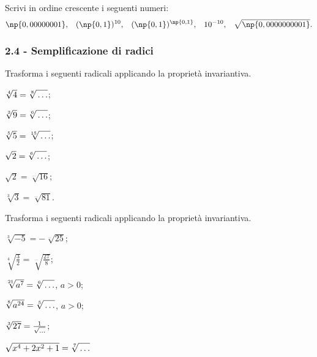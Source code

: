 \begin{esercizio}
 \label{ese:2.22}
Scrivi in ordine crescente i seguenti numeri:
 \[\np{0,00000001}\text{,}\quad (\np{0,1})^{10}\text{,}\quad (\np{0,1})^{\np{0,1}}\text{,}\quad 10^{-10}\text{,}\quad \sqrt{\np{0,0000000001}}.\]
\end{esercizio}

\subsubsection*{2.4 - Semplificazione di radici}
\begin{esercizio}
 \label{ese:2.23}
Trasforma i seguenti radicali applicando la proprietà invariantiva.
 \begin{multicols}{3}
 \begin{enumeratea}
 \item $\sqrt[4]4=\sqrt[8]{\vphantom{4}\ldots}$;
 \item $\sqrt[3]9=\sqrt[6]{\vphantom{4}\ldots}$;
 \item $\sqrt[5]5=\sqrt[15]{\vphantom{4}\ldots}$;
 \item $\sqrt 2=\sqrt[6]{\vphantom{4}\ldots}$;
 \item $\sqrt 2=\sqrt[\ldots]{16}$;
 \item $\sqrt[3]3=\sqrt[\ldots]{81}$.
 \end{enumeratea}
 \end{multicols}
\end{esercizio}

\begin{esercizio}
\label{ese:2.24}
Trasforma i seguenti radicali applicando la proprietà invariantiva.
 \begin{multicols}{3}
 \begin{enumeratea}
 \item $\sqrt[3]{-5}=-\sqrt[\ldots]{25}$;
 \item $\sqrt[4]{\frac 3 2}=\sqrt[\ldots]{\frac{27} 8}$;
 \item $\sqrt[21]{a^7}=\sqrt[6]{\vphantom{4}\ldots}$, $a>0$;
 \item $\sqrt[8]{a^{24}}=\sqrt[5]{\vphantom{4}\ldots}$, $a>0$;
 \item $\sqrt[3]{27}=\frac 1{\sqrt{\vphantom{4}\ldots}}$;
 \item $\sqrt{x^4+2x^2+1}=\sqrt[7]{\vphantom{4}\ldots}$
 \end{enumeratea}
 \end{multicols}
\end{esercizio}

